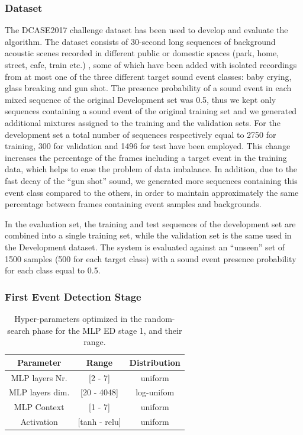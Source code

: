 \subsubsection{Dataset}
\label{sec:dcase-rare-2017-dataset}

The DCASE2017 challenge dataset \cite{DCASE2017challenge} has been used to develop and evaluate the algorithm.  The dataset consists of 30-second long sequences of background acoustic scenes recorded in different public or domestic spaces (park, home, street, cafe, train etc.) \cite{mesaros2016tut}, some of which have been added with isolated recordings from at most one of the three different target sound event classes: baby crying, glass breaking and gun shot. 
The presence probability of a sound event in each mixed sequence of the original Development set was 0.5, thus we kept only sequences containing a sound event of the original training set and we generated additional mixtures assigned to the training and the validation sets.
For the development set a total number of sequences respectively equal to 2750 for training, 300 for validation and 1496 for test have been employed.
This change increases the percentage of the frames including a target event in the training data, which helps to ease the problem of data imbalance. In addition, due to the fast decay of the ``gun shot'' sound, we generated more sequences containing this event class compared to the others, in order to maintain approximately the same percentage between frames containing event samples and backgrounds.

In the evaluation set, the training and test sequences of the development set are combined into a single training set,  while the validation set is the same used in the Development dataset. The system is evaluated against an ``unseen'' set of 1500 samples (500 for each target class) with a sound event presence probability for each class equal to 0.5.


\subsubsection{First Event Detection Stage}


\begin{table}[b]
	
	\centering
	\footnotesize
	\begin{tabular} {|c | c | c|}
		\hline
		Parameter & Range & Distribution\\  
		\hline
		\hline                                     
		MLP layers Nr.  & [2 - 7]& uniform \\
		\hline                                     
		MLP layers dim. & [20 - 4048]& log-unifom \\
		\hline                                     
		MLP Context & [1 - 7] & uniform\\
		\hline
		Activation & [tanh - relu] & uniform\\
		\hline
	\end{tabular}
	\caption[Rare Sound Event Detection - ED Stage 1 Experiments]{Hyper-parameters optimized in the random-search phase for the MLP ED stage 1, and their range.}
	\label{tbl:hyper-params-mlp}
\end{table}


